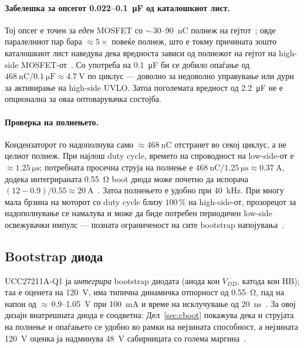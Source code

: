 \documentclass[journal,onecolumn,11pt]{IEEEtran}
\begin{document}
\paragraph{Забелешка за опсегот \mbox{0.022--\SI{0.1}{\micro\farad}} од каталошкиот лист.}
Тој опсег е точен за \emph{еден} MOSFET со $\sim$\,30--\SI{90}{\nano\coulomb} полнеж
на гејтот~\cite{ucc27211}; овде паралелниот пар бара $\approx 5\times$ повеќе полнеж,
што е токму причината зошто каталошкиот лист наведува дека вредноста зависи од
полнежот на гејтот на high-side MOSFET-от~\cite{ucc27211}. Со употреба на
\SI{0.1}{\micro\farad} би се добило опаѓање од
$\SI{468}{\nano\coulomb}/\SI{0.1}{\micro\farad}\approx\SI{4.7}{\volt}$ по циклус ---
доволно за недоволно управување или дури за активирање на high-side UVLO. Затоа
поголемата вредност од \SI{2.2}{\micro\farad} не е опционална за оваа оптоварувачка
состојба.

\paragraph{Проверка на полнењето.} Кондензаторот го надополнува само
$\approx\SI{468}{\nano\coulomb}$ отстранет во секој циклус, а не целиот полнеж. При
најлош duty cycle, времето на спроводност на low-side-от е $\approx\SI{1.25}{\micro\second}$;
потребната просечна струја на полнење е
$\SI{468}{\nano\coulomb}/\SI{1.25}{\micro\second}\approx\SI{0.37}{\ampere}$, додека
интегрираната \SI{0.55}{\ohm} boot диода може почетно да испорача
$(12-0.9)/0.55\approx\SI{20}{\ampere}$~\cite{ucc27211}. Затоа полнењето е удобно при
\SI{40}{\kilo\hertz}. При многу мала брзина на моторот со duty cycle близу
$100\,\%$ на high-side-от, прозорецот за надополнување се намалува и може да биде
потребен периодичен low-side освежувачки импулс --- позната ограниченост на сите
bootstrap напојувања~\cite{infineon_monolithic,infineon_bootoverview}.

\subsection{Bootstrap диода}
UCC27211A-Q1 ја \emph{интегрира} bootstrap диодата (анода кон $V_{DD}$, катода кон
HB); таа е оценета на \SI{120}{\volt}, има типична динамичка отпорност од
\SI{0.55}{\ohm}, пад на напон од $\approx$\,0.9--\SI{1.05}{\volt} при
\SI{100}{\milli\ampere} и време на исклучување од \SI{20}{\nano\second}~\cite{ucc27211}.
За овој дизајн внатрешната диода е соодветна: Дел~\ref{sec:cboot} покажува дека и
струјата на полнење и опаѓањето се удобно во рамки на нејзината способност, а
нејзината \SI{120}{\volt} оценка ја надминува \SI{48}{\volt} сабирницата со голема
маргина~\cite{ucc27211}.
\end{document}
